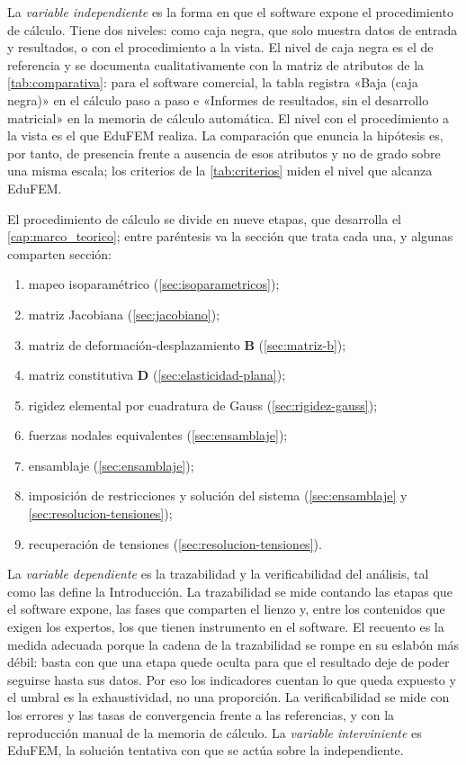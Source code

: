 La \emph{variable independiente} es la forma en que el software expone el procedimiento de cálculo. Tiene dos niveles: como caja negra, que solo muestra datos de entrada y resultados, o con el procedimiento a la vista. El nivel de caja negra es el de referencia y se documenta cualitativamente con la matriz de atributos de la \autoref{tab:comparativa}: para el software comercial, la tabla registra «Baja (caja negra)» en el cálculo paso a paso e «Informes de resultados, sin el desarrollo matricial» en la memoria de cálculo automática. El nivel con el procedimiento a la vista es el que EduFEM realiza. La comparación que enuncia la hipótesis es, por tanto, de presencia frente a ausencia de esos atributos y no de grado sobre una misma escala; los criterios de la \autoref{tab:criterios} miden el nivel que alcanza EduFEM.

El procedimiento de cálculo se divide en nueve etapas, que desarrolla el \autoref{cap:marco_teorico}; entre paréntesis va la sección que trata cada una, y algunas comparten sección:
\begin{enumerate}
    \item mapeo isoparamétrico (\autoref{sec:isoparametricos});
    \item matriz Jacobiana (\autoref{sec:jacobiano});
    \item matriz de deformación-desplazamiento $\bm{B}$ (\autoref{sec:matriz-b});
    \item matriz constitutiva $\bm{D}$ (\autoref{sec:elasticidad-plana});
    \item rigidez elemental por cuadratura de Gauss (\autoref{sec:rigidez-gauss});
    \item fuerzas nodales equivalentes (\autoref{sec:ensamblaje});
    \item ensamblaje (\autoref{sec:ensamblaje});
    \item imposición de restricciones y solución del sistema (\autoref{sec:ensamblaje} y \autoref{sec:resolucion-tensiones});
    \item recuperación de tensiones (\autoref{sec:resolucion-tensiones}).
\end{enumerate}

La \emph{variable dependiente} es la trazabilidad y la verificabilidad del análisis, tal como las define la Introducción. La trazabilidad se mide contando las etapas que el software expone, las fases que comparten el lienzo y, entre los contenidos que exigen los expertos, los que tienen instrumento en el software. El recuento es la medida adecuada porque la cadena de la trazabilidad se rompe en su eslabón más débil: basta con que una etapa quede oculta para que el resultado deje de poder seguirse hasta sus datos. Por eso los indicadores cuentan lo que queda expuesto y el umbral es la exhaustividad, no una proporción. La verificabilidad se mide con los errores y las tasas de convergencia frente a las referencias, y con la reproducción manual de la memoria de cálculo. La \emph{variable interviniente} es EduFEM, la solución tentativa con que se actúa sobre la independiente.

